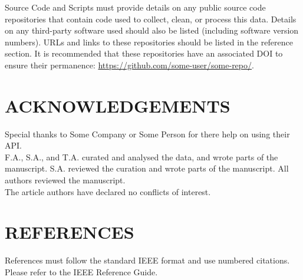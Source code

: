 \documentclass{IEEEoj-data}
\begin{document}
Source Code and Scripts must provide details on any public source code repositories that contain code used to collect, clean, or process this data. Details on any third-party software used should also be listed (including software version numbers). URLs and links to these repositories should be listed in the reference section. It is recommended that these repositories have an associated DOI to ensure their permanence: \url{https://github.com/some-user/some-repo/}.

\section*{ACKNOWLEDGEMENTS}
Special thanks to Some Company or Some Person for there help on using their API.
\\
\text{\hspace{1em}} F.A., S.A., and T.A. curated and analysed the data, and wrote parts of the manuscript.
S.A. reviewed the curation and wrote parts of the manuscript. All authors reviewed the manuscript.
\\
\text{\hspace{1em}} The article authors have declared no conflicts of interest.
\\

\section*{REFERENCES}
References must follow the standard IEEE format and use numbered citations. Please refer to the IEEE Reference Guide.
\end{document}
